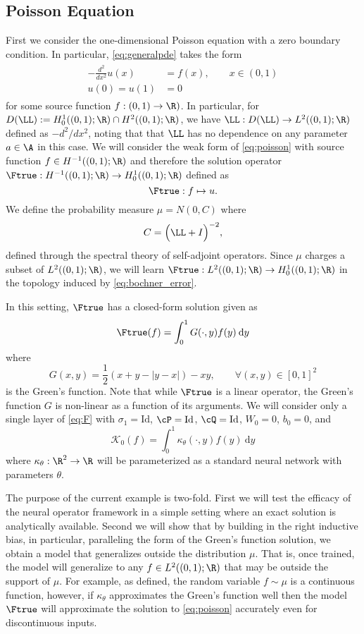 \subsection{Poisson Equation}
\label{ssec:poisson}
First we consider the one-dimensional Poisson equation with a zero boundary condition.
In particular, \eqref{eq:generalpde} takes the form
\begin{align}
\label{eq:poisson}
\begin{split}
    -\frac{d^2}{dx^2} u(x) &= f(x),  \qquad x \in (0,1)\\
    u(0) = u(1) &= 0
\end{split}
\end{align}
for some source function \(f: (0,1) \to \R)\). In particular, for \(D(\LL):=H^1_0((0,1);\R) \cap H^2((0,1);\R)\), we have \(\LL: D(\LL) \to L^2((0,1);\R)\) defined as $-d^2/dx^2$, noting that 
that $\LL$ has no dependence on any parameter \(a \in \A\) in this case. We will consider the weak form of \eqref{eq:poisson} with source function \(f \in H^{-1}((0,1);\R)\) and therefore the solution operator  \(\Ftrue : H^{-1}((0,1);\R) \to H^1_0((0,1);\R)\) defined as
\[\Ftrue: f \mapsto u.\]
We define the probability measure \(\mu = N(0,C)\) where
\[C = \Bigl ( \LL + I \Bigl)^{-2},\]
defined through the spectral theory of self-adjoint operators.  Since \(\mu\) charges a subset of \(L^2((0,1);\R)\), we will learn \(\Ftrue : L^2((0,1);\R) \to H^1_0((0,1);\R)\) in the topology induced by \eqref{eq:bochner_error}.

In this setting, \(\Ftrue\) has a closed-form solution given as
\[\Ftrue(f) = \int_0^1 G(\cdot,y) f(y) \: \text{d}y\]
where
\[G(x,y) = \frac{1}{2} \left ( x + y - |y-x| \right ) - xy, \qquad \forall (x,y) \in [0,1]^2\]
is the Green's function. Note that while \(\Ftrue\) is a linear operator, the Green's function \(G\) is non-linear
as a function of its arguments. We will consider only a single layer of \eqref{eq:F} with \(\sigma_1 = \text{Id}\), \(\cP = \text{Id}\), \(\cQ = \text{Id}\), \(W_0 = 0\), \(b_0 = 0\), and 
\[\mathcal{K}_0(f) = \int_0^1 \kappa_{\theta} (\cdot,y) f(y) \: \text{d}y\]
where \(\kappa_\theta : \R^2 \to \R\) will be parameterized as a standard neural network with parameters \(\theta\).

The purpose of the current example is two-fold. First we will test the efficacy of the neural operator framework in a simple setting where an exact solution is analytically available. Second we will show that by building in the right inductive bias, in particular, paralleling the form of the Green's function solution, we obtain a model that generalizes outside the distribution \(\mu\). That is, once trained, the model will generalize to any \(f \in L^2((0,1);\R)\) that may be outside the support of \(\mu\). For example, as defined, the random variable \(f \sim \mu\) is a continuous function, however, if \(\kappa_\theta\) approximates the Green's function well then the model \(\Ftrue\) will approximate the solution to \eqref{eq:poisson} accurately even for discontinuous inputs. 




